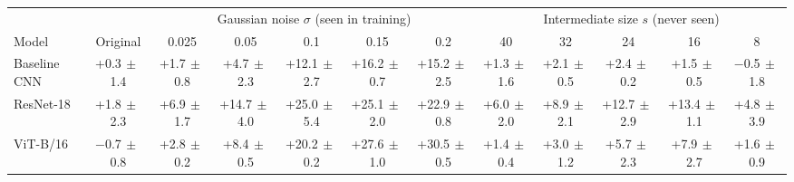 \begin{tabular}{lccccccccccc}
\toprule
 & & \multicolumn{5}{c}{Gaussian noise $\sigma$ (seen in training)} & \multicolumn{5}{c}{Intermediate size $s$ (never seen)} \\
\cmidrule(lr){3-7}\cmidrule(lr){8-12}
Model & Original & 0.025 & 0.05 & 0.1 & 0.15 & 0.2 & 40 & 32 & 24 & 16 & 8 \\
\midrule
Baseline CNN & +0.3{\scriptsize$\,\pm\,$1.4} & +1.7{\scriptsize$\,\pm\,$0.8} & +4.7{\scriptsize$\,\pm\,$2.3} & +12.1{\scriptsize$\,\pm\,$2.7} & +16.2{\scriptsize$\,\pm\,$0.7} & +15.2{\scriptsize$\,\pm\,$2.5} & +1.3{\scriptsize$\,\pm\,$1.6} & +2.1{\scriptsize$\,\pm\,$0.5} & +2.4{\scriptsize$\,\pm\,$0.2} & +1.5{\scriptsize$\,\pm\,$0.5} & $-$0.5{\scriptsize$\,\pm\,$1.8} \\
ResNet-18 & +1.8{\scriptsize$\,\pm\,$2.3} & +6.9{\scriptsize$\,\pm\,$1.7} & +14.7{\scriptsize$\,\pm\,$4.0} & +25.0{\scriptsize$\,\pm\,$5.4} & +25.1{\scriptsize$\,\pm\,$2.0} & +22.9{\scriptsize$\,\pm\,$0.8} & +6.0{\scriptsize$\,\pm\,$2.0} & +8.9{\scriptsize$\,\pm\,$2.1} & +12.7{\scriptsize$\,\pm\,$2.9} & +13.4{\scriptsize$\,\pm\,$1.1} & +4.8{\scriptsize$\,\pm\,$3.9} \\
ViT-B/16 & $-$0.7{\scriptsize$\,\pm\,$0.8} & +2.8{\scriptsize$\,\pm\,$0.2} & +8.4{\scriptsize$\,\pm\,$0.5} & +20.2{\scriptsize$\,\pm\,$0.2} & +27.6{\scriptsize$\,\pm\,$1.0} & +30.5{\scriptsize$\,\pm\,$0.5} & +1.4{\scriptsize$\,\pm\,$0.4} & +3.0{\scriptsize$\,\pm\,$1.2} & +5.7{\scriptsize$\,\pm\,$2.3} & +7.9{\scriptsize$\,\pm\,$2.7} & +1.6{\scriptsize$\,\pm\,$0.9} \\
\bottomrule
\end{tabular}
